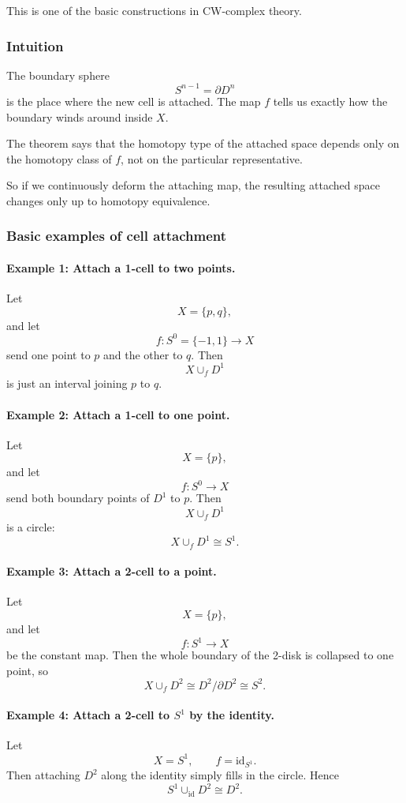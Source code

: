 \documentclass[12pt,a4paper]{article}
\theoremstyle{notespace}
\begin{document}
This is one of the basic constructions in CW-complex theory.

\subsubsection{Intuition}

The boundary sphere
\[
S^{n-1}=\partial D^n
\]
is the place where the new cell is attached. The map \(f\) tells us exactly how the boundary winds around inside \(X\).

The theorem says that the homotopy type of the attached space depends only on the homotopy class of \(f\), not on the particular representative.

So if we continuously deform the attaching map, the resulting attached space changes only up to homotopy equivalence.

\subsubsection{Basic examples of cell attachment}

\paragraph{Example 1: Attach a 1-cell to two points.}
Let
\[
X=\{p,q\},
\]
and let
\[
f:S^0=\{-1,1\}\to X
\]
send one point to \(p\) and the other to \(q\). Then
\[
X\cup_f D^1
\]
is just an interval joining \(p\) to \(q\).

\paragraph{Example 2: Attach a 1-cell to one point.}
Let
\[
X=\{p\},
\]
and let
\[
f:S^0\to X
\]
send both boundary points of \(D^1\) to \(p\). Then
\[
X\cup_f D^1
\]
is a circle:
\[
X\cup_f D^1 \cong S^1.
\]

\paragraph{Example 3: Attach a 2-cell to a point.}
Let
\[
X=\{p\},
\]
and let
\[
f:S^1\to X
\]
be the constant map. Then the whole boundary of the 2-disk is collapsed to one point, so
\[
X\cup_f D^2 \cong D^2/\partial D^2 \cong S^2.
\]

\paragraph{Example 4: Attach a 2-cell to \(S^1\) by the identity.}
Let
\[
X=S^1,
\qquad
f=\mathrm{id}_{S^1}.
\]
Then attaching \(D^2\) along the identity simply fills in the circle. Hence
\[
S^1\cup_{\mathrm{id}} D^2 \cong D^2.
\]
\end{document}
